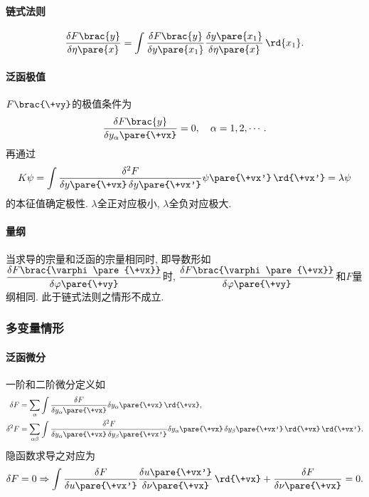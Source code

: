 \documentclass[hidelinks]{ctexart}
\begin{document}

\paragraph{链式法则} %
\label{par:链式法则}

\[ \frac{\delta F\brac{y}}{\delta \eta\pare{x}} = \int \frac{\delta F\brac{y}}{\delta y\pare{x_1}}\frac{\delta y\pare{x_1}}{\delta \eta\pare{x}}\,\rd{x_1}. \]


\paragraph{泛函极值} %
\label{par:泛函极值}

$F\brac{\+vy}$的极值条件为
\[ \frac{\delta F\brac{y}}{\delta y_\alpha\pare{\+vx}} = 0,\quad \alpha = 1,2,\cdots. \]
再通过
\[ K\psi = \int \frac{\delta^2 F}{\delta y\pare{\+vx}\,\delta y\pare{\+vx'}}\psi\pare{\+vx'}\,\rd{\+vx'} = \lambda \psi \]
的本征值确定极性. $\lambda$全正对应极小, $\lambda$全负对应极大.


\paragraph{量纲} %
\label{par:量纲}

当求导的宗量和泛函的宗量相同时, 即导数形如$\displaystyle \frac{\delta F\brac{\varphi\pare{\+vx}}}{\delta \varphi\pare{\+vy}}$时, $\displaystyle \frac{\delta F\brac{\varphi\pare{\+vx}}}{\delta \varphi\pare{\+vy}}$和$F$量纲相同. 此于链式法则之情形不成立.



\subsubsection{多变量情形} %
\label{ssub:多变量情形}

\paragraph{泛函微分} %
\label{par:泛函微分}

一阶和二阶微分定义如
\begin{align*}
    \delta F &= \sum_\alpha \int \frac{\delta F}{\delta y_\alpha\pare{\+vx}} \delta y_\alpha\pare{\+vx}\,\rd{\+vx}, \\
    \delta^2 F &= \sum_{\alpha\beta} \int \frac{\delta^2 F}{\delta y_\alpha\pare{\+vx}\,\delta y_\beta\pare{\+vx'}}\delta y_\alpha\pare{\+vx}\,\delta y_\beta\pare{\+vx'}\,\rd{\+vx}\,\rd{\+vx'}.
\end{align*}
隐函数求导之对应为
\[ \delta F = 0 \Rightarrow \int \frac{\delta F}{\delta u\pare{\+vx'}} \frac{\delta u\pare{\+vx'}}{\delta \nu\pare{\+vx}} \,\rd{\+vx} + \frac{\delta F}{\delta \nu\pare{\+vx}} = 0. \]
\end{document}
